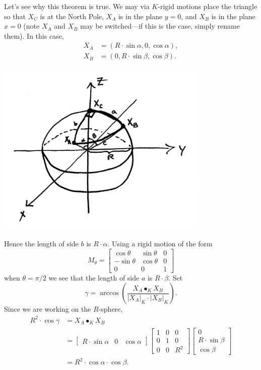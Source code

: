 \documentclass{ximera}
\begin{document}
Let's see why this theorem is true.  We may via $K$-rigid motions
place the triangle so that $X_C$ is at the North Pole, $X_A$ is in the
plane $y=0$, and $X_B$ is in the plane $x=0$ (note $X_A$ and $X_B$ may
be switched---if this is the case, simply rename them). In this case,
\begin{align*}
  X_A &= (R\cdot \sin\alpha, 0, \cos\alpha),\\
  X_B &= (0, R\cdot \sin \beta, \cos\beta).
\end{align*}
\begin{image}
  \includegraphics[width=4in]{sphPythag.png}
\end{image}
Hence the length of side $b$ is $R\cdot\alpha$. Using a rigid motion of the form
\[
M_\theta=
\begin{bmatrix}
  \cos\theta & \sin\theta & 0\\
  -\sin\theta & \cos\theta & 0\\
  0 & 0 & 1
\end{bmatrix}
\]
when $\theta = \pi/2$ we see that the length of side $a$ is $R\cdot
\beta$. Set
\[
\gamma = \arccos\left(\frac{X_A\bullet_K X_B}{|X_A|_K\cdot |X_B|_K}\right).
\]
Since we are working on the $R$-sphere,
\begin{align*}
  R^2\cdot \cos \gamma &= X_A\bullet_K X_B\\
  &=
  \begin{bmatrix}
    R\cdot \sin\alpha &  0 & \cos\alpha
  \end{bmatrix}
    \begin{bmatrix}
      1 & 0 & 0\\
      0 & 1 & 0\\
      0 & 0 & R^2
    \end{bmatrix}
    \begin{bmatrix}
      0\\
      R\cdot\sin\beta\\
      \cos\beta
    \end{bmatrix}\\
   &=R^2 \cdot \cos\alpha \cdot \cos\beta.
  \end{align*}
\end{document}
